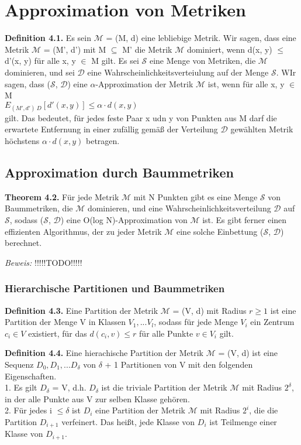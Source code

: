\chapter{Approximation von Metriken}

\textbf{Definition 4.1.} Es sein $\mathcal{M}$ = (M, d) eine lebliebige Metrik. Wir sagen, dass eine Metrik $\mathcal{M}$ = (M', d') mit M $\subseteq$ M' die Metrik $\mathcal{M}$ dominiert, wenn d(x, y) $\le$ d'(x, y) für alle x, y $\in$ M gilt. Es sei $\mathcal{S}$ eine Menge von Metriken, die $\mathcal{M}$ dominieren, und sei $\mathcal{D}$ eine Wahrscheinlichkeitsverteiulung auf der Menge $\mathcal{S}$. WIr sagen, dass ($\mathcal{S}$, $\mathcal{D}$) eine $\alpha$-Approximation der Metrik $\mathcal{M}$ ist, wenn für alle x, y $\in$ M
\\$E_{(M', d')~D} [d'(x, y)] \le \alpha \cdot d(x, y)$\\
 gilt. Das bedeutet, für jedes feste Paar x udn y von Punkten aus M darf die erwartete Entfernung in einer zufällig gemäß der Verteilung $\mathcal{D}$ gewählten Metrik höchstens $\alpha \cdot d(x, y)$ betragen.

\section{Approximation durch Baummetriken}

\textbf{Theorem 4.2.} Für jede Metrik $\mathcal{M}$ mit N Punkten gibt es eine Menge $\mathcal{S}$ von Baummetriken, die $\mathcal{M}$ dominieren, und eine Wahrscheinlichkeitsverteilung $\mathcal{D}$ auf $\mathcal{S}$, sodass ($\mathcal{S}$, $\mathcal{D}$) eine O(log N)-Approximation von $\mathcal{M}$ ist. Es gibt ferner einen effizienten Algorithmus, der zu jeder Metrik $\mathcal{M}$ eine solche Einbettung ($\mathcal{S}$, $\mathcal{D}$) berechnet.

\textit{Beweis:} !!!!!TODO!!!!!

\subsection{Hierarchische Partitionen und Baummetriken}

\textbf{Definition 4.3.} Eine Partition der Metrik $\mathcal{M}$ = (V, d) mit Radius $r \ge 1$ ist eine Partition der Menge V in Klassen $V_{1}, ... V_{l}$, sodass für jede Menge $V_{i}$ ein Zentrum $c_{i} \in V$ existiert, für das $d(c_{i}, v) \le r$ für alle Punkte $v \in V_{i}$ gilt.

\textbf{Definition 4.4.} Eine hierachische Partition der Metrik $\mathcal{M}$ = (V, d) ist eine Sequenz $D_{0}, D_{1}, ... D_{\delta}$ von $\delta$ + 1 Partitionen von V mit den folgenden Eigenschaften.\\
1. Es gilt $D_{\delta}$ = {V}, d.h. $D_{\delta}$ ist die triviale Partition der Metrik $\mathcal{M}$ mit Radius $2^{\delta}$, in der alle Punkte aus V zur selben Klasse gehören. \\
2. Für jedes i $\le \delta$ ist $D_{i}$ eine Partition der Metrik $\mathcal{M}$ mit Radius $2^{i}$, die die Partition $D_{i+1}$ verfeinert. Das heißt, jede Klasse von $D_{i}$ ist Teilmenge einer Klasse von $D_{i+1}$.


